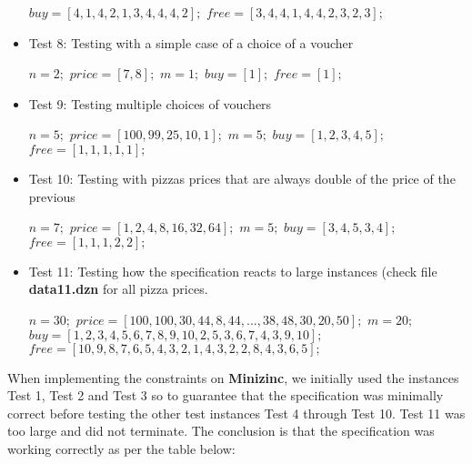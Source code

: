 \documentclass[conference]{IEEEtran}
\newcommand\tab[1][0.3cm]{\hspace*{#1}}
\begin{document}
\begin{itemize}
\begin{algorithmic}
\State $buy = [4,1,4,2,1,3,4,4,4,2];$
\State $free = [3,4,4,1,4,4,2,3,2,3];$
\\
\end{algorithmic}
\item Test 8: Testing with a simple case of a choice of a voucher
\begin{algorithmic}
\State $n = 2;$
\State $price = [7, 8];$
\State $m = 1;$
\State $buy = [1];$
\State $free = [1];$
\\
\end{algorithmic}
\item Test 9: Testing multiple choices of vouchers
\begin{algorithmic}
\State $n = 5;$
\State $price = [100, 99, 25, 10, 1];$
\State $m = 5;$
\State $buy = [1, 2, 3, 4, 5];$
\State $free = [1, 1, 1, 1, 1];$
\\
\end{algorithmic}
\item Test 10: Testing with pizzas prices that are always double of the price of the previous
\begin{algorithmic}
\State $n = 7;$
\State $price = [1, 2, 4, 8, 16, 32, 64];$
\State $m = 5;$
\State $buy = [3, 4, 5, 3, 4];$
\State $free = [1, 1, 1, 2, 2];$
\\
\end{algorithmic}
\item Test 11: Testing how the specification reacts to large instances (check file \textbf{data11.dzn} for all pizza prices.
\begin{algorithmic}
\State $n = 30;$
\State $price = [100, 100, 30, 44, 8, 44, ... ,38, 48, 30, 20, 50];$
\State $m = 20;$
\State $buy = [1, 2, 3, 4, 5, 6, 7, 8, 9, 10, 2, 5, 3, 6, 7, 4, 3, 9, 10];$
\State $free = [10, 9, 8, 7, 6, 5, 4, 3, 2, 1, 4, 3, 2, 2, 8, 4, 3, 6, 5];$
\end{algorithmic}
\end{itemize}
\tab When implementing the constraints on \textbf{Minizinc}, we initially used the instances Test 1, Test 2 and Test 3 so to guarantee that the specification was minimally correct before testing the other test instances Test 4 through Test 10. Test 11 was too large and did not terminate. The conclusion is that the specification was working correctly as per the table below:
\\
\\
\end{document}
